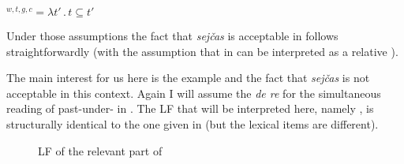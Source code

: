 \documentclass[output=paper,modfonts,newtxmath,hidelinks]{langscibook}
\begin{document}
\ea {}$^{w,t,g,c}=\lambda t'\,.\,t\subseteq t'$\label{20:ex45}
\z

\noindent Under those assumptions the fact that \textit{sejčas} is acceptable in  follows straightforwardly (with the assumption that  in  can be interpreted as a relative ).\largerpage[2]

The main interest for us here is the example  and the fact that \textit{sejčas} is not acceptable in this context. Again I will assume the \textit{de re}  for the simultaneous reading of past-under- in . The LF that will be interpreted here, namely , is structurally identical to the one given in  (but the lexical items are different).

\begin{figure}
\caption{LF of the relevant part of }\label{20:ex46}
\end{figure}
\end{document}
